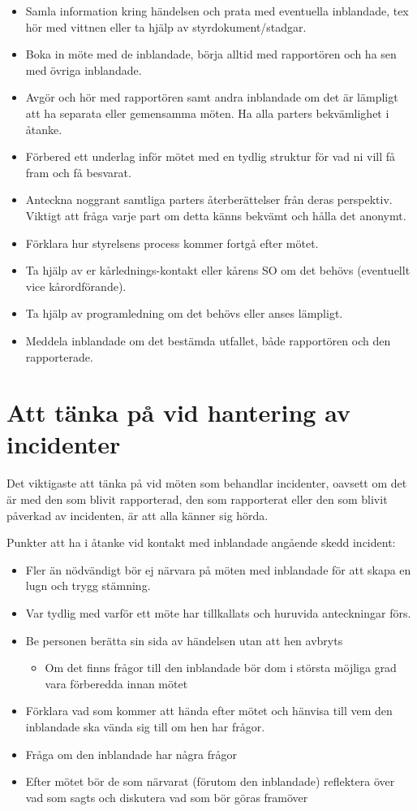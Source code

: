 \documentclass[a4paper]{dtek}
\begin{document}
\begin{itemize}
    \item Samla information kring händelsen och prata med eventuella inblandade, tex hör med vittnen eller ta hjälp av styrdokument/stadgar. 
    \item Boka in möte med de inblandade, börja alltid med rapportören och ha sen med övriga inblandade.
    \item Avgör och hör med rapportören samt andra inblandade om det är lämpligt att ha separata eller gemensamma möten. Ha alla parters bekvämlighet i åtanke. 
    \item Förbered ett underlag inför mötet med en tydlig struktur för vad ni vill få fram och få besvarat. 
    \item Anteckna noggrant samtliga parters återberättelser från deras perspektiv. Viktigt att fråga varje part om detta känns bekvämt och hålla det anonymt. 
    \item Förklara hur styrelsens process kommer fortgå efter mötet. 
    \item Ta hjälp av er kårlednings-kontakt eller kårens SO om det behövs (eventuellt vice kårordförande). 
    \item Ta hjälp av programledning om det behövs eller anses lämpligt.
    \item Meddela inblandade om det bestämda utfallet, både rapportören och den rapporterade. 
\end{itemize}

\section{Att tänka på vid hantering av incidenter}
Det viktigaste att tänka på vid möten som behandlar incidenter, oavsett om det är med den som blivit rapporterad, den som rapporterat eller den som blivit påverkad av incidenten, är att alla känner sig hörda.

Punkter att ha i åtanke vid kontakt med inblandade angående skedd incident:
\begin{itemize}
    \item Fler än nödvändigt bör ej närvara på möten med inblandade för att skapa en lugn och trygg stämning.
    \item Var tydlig med varför ett möte har tillkallats och huruvida anteckningar förs.
    \item Be personen berätta sin sida av händelsen utan att hen avbryts
    \begin{itemize}
        \item Om det finns frågor till den inblandade bör dom i största möjliga grad vara förberedda innan mötet
    \end{itemize}
    \item Förklara vad som kommer att hända efter mötet och hänvisa till vem den inblandade ska vända sig till om hen har frågor.
    \item Fråga om den inblandade har några frågor
    \item Efter mötet bör de som närvarat (förutom den inblandade) reflektera över vad som sagts och diskutera vad som bör göras framöver
\end{itemize}
\end{document}
